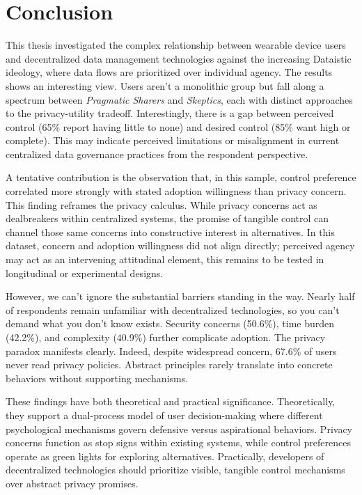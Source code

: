 \section{Conclusion}
This thesis investigated the complex relationship between wearable device users and decentralized data management technologies against the increasing Dataistic ideology, where data flows are prioritized over individual agency. The results shows an interesting view. Users aren't a monolithic group but fall along a spectrum between \textit{Pragmatic Sharers} and \textit{Skeptics}, each with distinct approaches to the privacy-utility tradeoff. Interestingly, there is a gap between perceived control (65\% report having little to none) and desired control (85\% want high or complete). This may indicate perceived limitations or misalignment in current centralized data governance practices from the respondent perspective.

A tentative contribution is the observation that, in this sample, control preference correlated more strongly with stated adoption willingness than privacy concern. This finding reframes the privacy calculus. While privacy concerns act as dealbreakers within centralized systems, the promise of tangible control can channel those same concerns into constructive interest in alternatives. In this dataset, concern and adoption willingness did not align directly; perceived agency may act as an intervening attitudinal element, this remains to be tested in longitudinal or experimental designs.

However, we can't ignore the substantial barriers standing in the way. Nearly half of respondents remain unfamiliar with decentralized technologies, so you can't demand what you don't know exists. Security concerns (50.6\%), time burden (42.2\%), and complexity (40.9\%) further complicate adoption. The privacy paradox manifests clearly. Indeed, despite widespread concern, 67.6\% of users never read privacy policies. Abstract principles rarely translate into concrete behaviors without supporting mechanisms.

These findings have both theoretical and practical significance. Theoretically, they support a dual-process model of user decision-making where different psychological mechanisms govern defensive versus aspirational behaviors. Privacy concerns function as stop signs within existing systems, while control preferences operate as green lights for exploring alternatives. Practically, developers of decentralized technologies should prioritize visible, tangible control mechanisms over abstract privacy promises.

